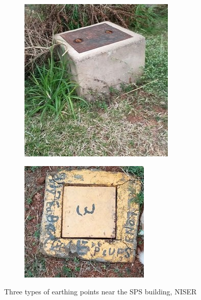 \begin{figure}[H]
\begin{subfigure}[b]{0.25\textwidth}
         \includegraphics[width=\textwidth]{images/2.JPG}
     \end{subfigure}
     \begin{subfigure}[b]{0.25\textwidth}
        \centering
        \includegraphics[width=\textwidth]{images/3.JPG}
    \end{subfigure}
    \hfill
    \caption{Three types of earthing points near the SPS building, NISER}
    \label{earth}
\end{figure}